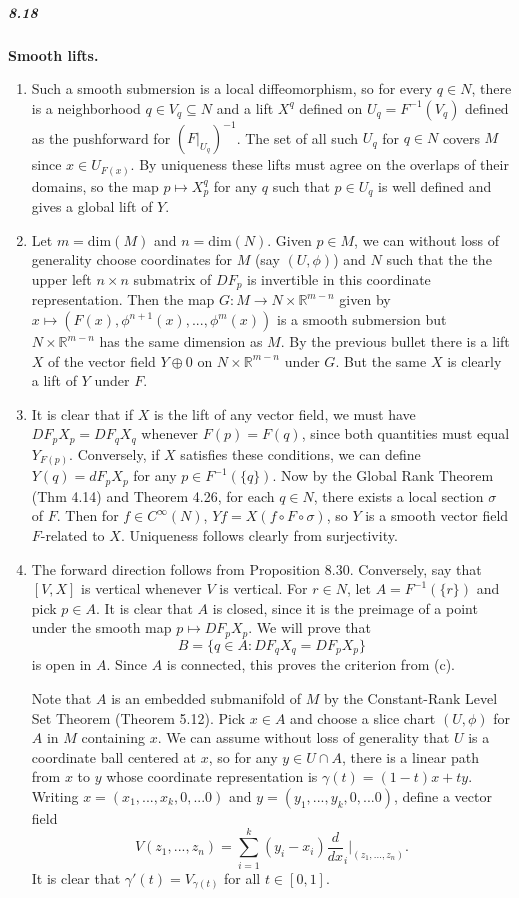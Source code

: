 \documentclass[10pt,letter]{article}
\begin{document}
\subparagraph{8.18} {\bf Smooth lifts.}
\begin{enumerate}[label=(\alph*)]
\item Such a smooth submersion is a local diffeomorphism, so for every $q \in N$, there is a neighborhood $q \in V_q \subseteq N$ and a lift $X^q$ defined on $U_q = F^{-1}(V_q)$ defined as the pushforward for $(F\vert_{U_q})^{-1}$. The set of all such $U_q$ for $q \in N$ covers $M$ since $x \in U_{F(x)}$. By uniqueness these lifts must agree on the overlaps of their domains, so the map $p \mapsto X^q_p$ for any $q$ such that $p \in U_q$ is well defined and gives a global lift of $Y$. 
\item Let $m = \text{dim}(M)$ and $n =\text{dim}(N)$. Given $p \in M$, we can without loss of generality choose coordinates for $M$ (say $(U,\phi)$) and $N$ such that the the upper left $n \times n$ submatrix of $DF_p$ is invertible in this coordinate representation. Then the map $G: M \rightarrow N \times \mathbb{R}^{m-n}$ given by $x \mapsto (F(x),\phi^{n+1}(x),...,\phi^m(x))$ is a smooth submersion but $N \times \mathbb{R}^{m-n}$ has the same dimension as $M$. By the previous bullet there is a lift $X$ of the vector field $Y \oplus 0$ on $N \times \mathbb{R}^{m-n}$ under $G$. But the same $X$ is clearly a lift of $Y$  under $F$. 
\item It is clear that if $X$ is the lift of any vector field, we must have $DF_p X_p = DF_q X_q$ whenever $F(p) = F(q)$, since both quantities must equal $Y_{F(p)}$. Conversely, if $X$ satisfies these conditions, we can define $Y(q) = dF_p X_p$ for any $p \in F^{-1}(\lbrace q \rbrace)$. Now by the Global Rank Theorem (Thm 4.14) and Theorem 4.26, for each $q \in N$, there exists a local section $\sigma$ of $F$. Then for $f \in C^{\infty}(N)$, $Yf = X(f \circ F \circ \sigma)$, so $Y$ is a smooth vector field $F$-related to $X$. Uniqueness follows clearly from surjectivity.
\item The forward direction follows from Proposition 8.30. Conversely, say that $[V,X]$ is vertical whenever $V$ is vertical. For $r \in N$, let $A = F^{-1}(\lbrace r \rbrace)$ and pick $p \in A$. It is clear that $A$ is closed, since it is the preimage of a point under the smooth map $p \mapsto DF_p X_p$. We will prove that \[ B = \lbrace q \in A: DF_q X_q = DF_p X_p \rbrace \] is open in $A$. Since $A$ is connected, this proves the criterion from (c). 

Note that $A$ is an embedded submanifold of $M$ by the Constant-Rank Level Set Theorem (Theorem 5.12). Pick $x \in A$ and choose a slice chart $(U,\phi)$ for $A$ in $M$ containing $x$. We can assume without loss of generality that $U$ is a coordinate ball centered at $x$, so for any $y \in U \cap A$, there is a linear path from $x$ to $y$ whose coordinate representation is $\gamma(t) = (1-t)x + ty$. Writing $x = (x_1,...,x_k,0,...0)$ and $y = (y_1,...,y_k,0,...0)$, define a vector field \[ V(z_1,...,z_n) = \sum_{i=1}^k (y_i-x_i) \frac{d}{dx}_i \bigg\vert_{(z_1,...,z_n)}. \] It is clear that $\gamma'(t) = V_{\gamma(t)}$ for all $t \in [0,1]$.  


\end{enumerate}
\end{document}
